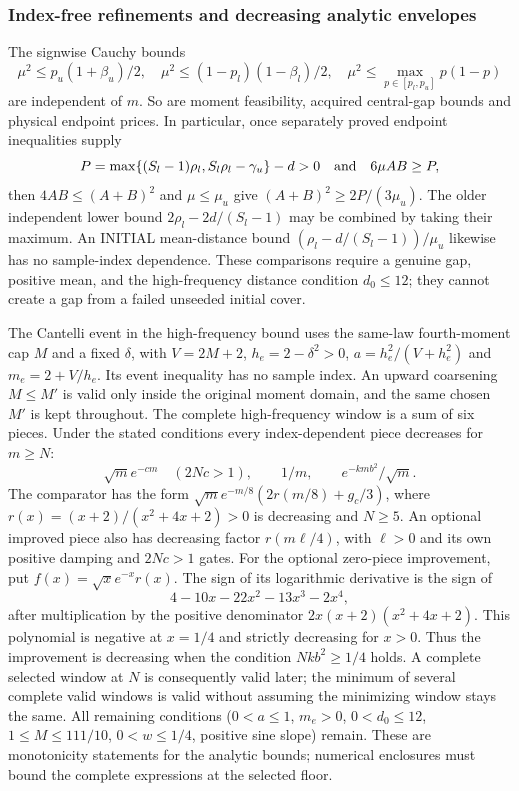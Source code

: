 \subsubsection{Index-free refinements and decreasing analytic envelopes}
\label{ms:finite:floor-envelopes}
The signwise Cauchy bounds
\[
 \mu^2\le p_u(1+\beta_u)/2,\quad
 \mu^2\le(1-p_l)(1-\beta_l)/2,\quad
 \mu^2\le\max_{p\in[p_l,p_u]}p(1-p)
\]
are independent of $m$. So are moment feasibility, acquired central-gap
bounds and physical endpoint prices. In particular, once separately proved
endpoint inequalities supply
\[
 P=\max\{(S_l-1)\rho_l,S_l\rho_l-\gamma_u\}-d>0
 \quad\hbox{and}\quad 6\mu AB\ge P,
\]
then $4AB\le(A+B)^2$ and $\mu\le\mu_u$ give
$(A+B)^2\ge2P/(3\mu_u)$. The older independent lower bound
$2\rho_l-2d/(S_l-1)$ may be combined by taking their maximum.
An INITIAL mean-distance bound $(\rho_l-d/(S_l-1))/\mu_u$ likewise
has no sample-index dependence. These comparisons require a genuine
gap, positive mean, and the high-frequency distance condition $d_0\le12$;
they cannot create a gap from a failed unseeded initial cover.

The Cantelli event in the high-frequency bound uses the same-law fourth-moment cap $M$ and a fixed
$\delta$, with $V=2M+2$, $h_e=2-\delta^2>0$,
$a=h_e^2/(V+h_e^2)$ and $m_e=2+V/h_e$. Its event inequality has no
sample index. An upward coarsening $M\le M'$ is valid only inside the
original moment domain, and the same chosen $M'$ is kept throughout.
The complete high-frequency window is a sum of six pieces. Under the
stated conditions every index-dependent piece decreases for $m\ge N$:
\[
 \sqrt m e^{-cm}\quad(2Nc>1),\qquad 1/m,
 \qquad e^{-km b^2}/\sqrt m.
\]
The comparator has the form
$\sqrt m e^{-m/8}(2r(m/8)+g_c/3)$, where
$r(x)=(x+2)/(x^2+4x+2)>0$ is decreasing and $N\ge5$.
An optional improved piece also has decreasing factor $r(m\ell/4)$,
with $\ell>0$ and its own positive damping and $2Nc>1$ gates.
For the optional zero-piece improvement, put
$f(x)=\sqrt x e^{-x}r(x)$. The sign of its logarithmic derivative is
the sign of
\[
 4-10x-22x^2-13x^3-2x^4,
\]
after multiplication by the positive denominator
$2x(x+2)(x^2+4x+2)$. This polynomial is negative at $x=1/4$ and
strictly decreasing for $x>0$. Thus the improvement is decreasing when
the condition $Nkb^2\ge1/4$ holds. A complete selected window at $N$
is consequently valid later; the minimum of several complete valid
windows is valid without assuming the minimizing window stays the same.
All remaining conditions ($0<a\le1$, $m_e>0$, $0<d_0\le12$,
$1\le M\le111/10$, $0<w\le1/4$, positive sine slope) remain.
These are monotonicity statements for the analytic bounds; numerical
enclosures must bound the complete expressions at the selected floor.

